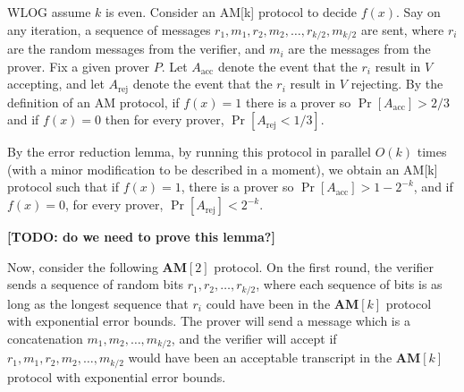 \documentclass{article}
\newcommand{\AM}{\mathbf{AM}}
\begin{document}
WLOG assume $k$ is even. Consider an AM[k] protocol to decide $f(x)$.  Say on any iteration, a sequence of messages $r_1, m_1, r_2, m_2, \dots, r_{k/2}, m_{k/2}$ are sent, where $r_i$ are the random messages from the verifier, and $m_i$ are the messages from the prover.
Fix a given prover $P$.  Let $A_\text{acc}$ denote the event that the $r_i$ result in $V$ accepting, and let $A_\text{rej}$ denote the event that the $r_i$ result in $V$ rejecting.
By the definition of an AM protocol, if $f(x) = 1$ there is a prover so $\Pr[A_\text{acc}] > 2/3$ and if $f(x) = 0$ then for every prover, $\Pr[A_\text{rej} < 1/3]$.

By the error reduction lemma, by running this protocol in parallel $O(k)$ times (with a minor modification to be described in a moment), we obtain an AM[k] protocol such that if $f(x) = 1$, there is a prover so $\Pr[A_\text{acc}] > 1 - 2^{-k}$, and if $f(x) = 0$, for every prover, $\Pr[A_\text{rej}] < 2^{-k}$.

\textbf{[TODO: do we need to prove this lemma?]}

Now, consider the following $\AM[2]$ protocol.  On the first round,
the verifier sends a sequence of random bits $r_1, r_2, \dots, r_{k/2}$,
where each sequence of bits is as long as the longest sequence that $r_i$ could have been in the $\AM[k]$ protocol with exponential error bounds.
The prover will send a message which is a concatenation $m_1, m_2, \dots, m_{k/2}$, and the verifier will accept if $r_1, m_1, r_2, m_2, \dots, m_{k/2}$ would have been an acceptable transcript in the $\AM[k]$ protocol with exponential error bounds.
\end{document}
